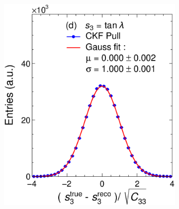 \begin{figure}[!ht]
\begin{subfigure}{0.32\textwidth}
         \caption{}
         \label{fig:resp2KFGAr}
     \end{subfigure}
          \begin{subfigure}{0.32\textwidth}
         \centering
         \includegraphics[width=\textwidth]{figures/ch5-KF_NDGAr/ToySample/ParScan/UnitK_p3.eps}
         \caption{}
         \label{fig:resp3KFGAr}
     \end{subfigure}
     \begin{subfigure}{0.32\textwidth}
         \centering

\end{subfigure}
\end{figure}
